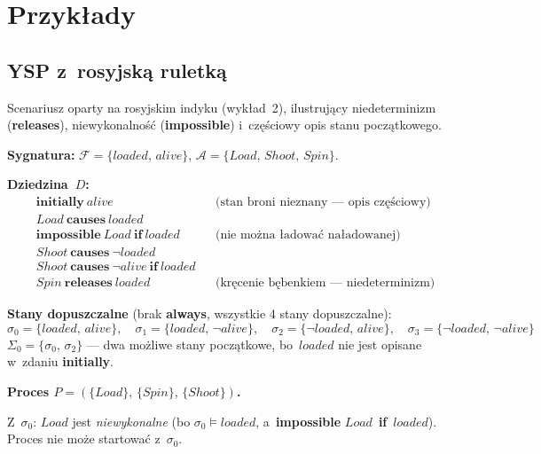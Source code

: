 \documentclass[11pt,a4paper]{article}
\newcommand{\causes}{\textbf{causes}}
\renewcommand{\iff}{\textbf{if}}
\newcommand{\initially}{\textbf{initially}}
\newcommand{\always}{\textbf{always}}
\newcommand{\impossible}{\textbf{impossible}}
\newcommand{\releases}{\textbf{releases}}
\begin{document}
\section{Przykłady}

\subsection{YSP z~rosyjską ruletką}

\noindent Scenariusz oparty na rosyjskim indyku (wykład~2), ilustrujący
niedeterminizm (\releases{}), niewykonalność (\impossible{})
i~częściowy opis stanu początkowego.

\medskip
\noindent\textbf{Sygnatura:}
$\mathcal{F} = \{\mathit{loaded},\, \mathit{alive}\}$, \quad
$\mathcal{A} = \{\mathit{Load},\, \mathit{Shoot},\, \mathit{Spin}\}$.

\medskip
\noindent\textbf{Dziedzina~$D$:}
\begin{align*}
  &\initially\ \mathit{alive}
    && \text{(stan broni nieznany --- opis częściowy)} \\
  &\mathit{Load}\ \causes\ \mathit{loaded}
    && \\
  &\impossible\ \mathit{Load}\ \iff\ \mathit{loaded}
    && \text{(nie można ładować naładowanej)} \\
  &\mathit{Shoot}\ \causes\ \neg\mathit{loaded}
    && \\
  &\mathit{Shoot}\ \causes\ \neg\mathit{alive}\ \iff\ \mathit{loaded}
    && \\
  &\mathit{Spin}\ \releases\ \mathit{loaded}
    && \text{(kręcenie bębenkiem --- niedeterminizm)}
\end{align*}

\noindent\textbf{Stany dopuszczalne}
(brak \always{}, wszystkie 4 stany dopuszczalne):
\[
  \sigma_0 = \{\mathit{loaded},\,\mathit{alive}\}, \quad
  \sigma_1 = \{\mathit{loaded},\,\neg\mathit{alive}\}, \quad
  \sigma_2 = \{\neg\mathit{loaded},\,\mathit{alive}\}, \quad
  \sigma_3 = \{\neg\mathit{loaded},\,\neg\mathit{alive}\}
\]
$\Sigma_0 = \{\sigma_0,\, \sigma_2\}$ --- dwa możliwe stany początkowe,
bo~$\mathit{loaded}$ nie jest opisane w~zdaniu \initially{}.

\medskip
\noindent\textbf{Proces $P = (\{\mathit{Load}\},\, \{\mathit{Spin}\},\, \{\mathit{Shoot}\})$.}

\smallskip
Z~$\sigma_0$: $\mathit{Load}$ jest \emph{niewykonalne}
(bo $\sigma_0 \models \mathit{loaded}$, a~\impossible{} $\mathit{Load}$~\iff{}~$\mathit{loaded}$).
Proces nie może startować z~$\sigma_0$.
\end{document}
